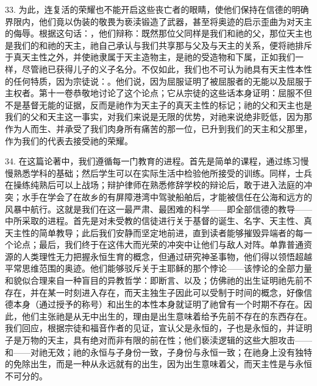 33. 为此，连复活的荣耀也不能开启这些丧亡者的眼睛，使他们保持在信德的明确界限内，他们竟以伪装的敬畏为亵渎锻造了武器，甚至将奥迹的启示歪曲为对天主的侮辱。根据这句话：，他们辩称：既然那位父同样是我们和祂的父，那位天主也是我们的和祂的天主，祂自己承认与我们共享那与父及与天主的关系，便将祂排斥于真天主性之外，并使祂隶属于天主造物主，是祂的受造物和下属，正如我们一样，尽管祂已获得儿子的义子名分。不仅如此，我们也不可认为祂具有天主性本性的任何特质，因为宗徒说：。他们说，因为屈服证明了被屈服者的无能以及屈服于主权者。第十一卷恭敬地讨论了这个论点；它从宗徒的这些话本身证明：屈服不但不是基督无能的证据，反而是祂作为天主子的真天主性的标记；祂的父和天主也是我们的父和天主这一事实，对我们来说是无限的优势，对祂来说绝非贬低，因为那作为人而生、并承受了我们肉身所有痛苦的那一位，已升到我们的天主和父那里，作为我们的代表去接受祂的荣耀。\par

34. 在这篇论著中，我们遵循每一门教育的进程。首先是简单的课程，通过练习慢慢熟悉学科的基础；然后学生可以在实际生活中检验他所接受的训练。同样，士兵在操练纯熟后可以上战场；辩护律师在熟悉修辞学校的辩论后，敢于进入法庭的冲突；水手在学会了在故乡的有屏障港湾中驾驶船舶后，才能被信任在公海和远方的风暴中航行。这就是我们在这一最严肃、最困难的科学——即全部信德的教导——中所采取的进程。首先是对未受教的信徒进行关于基督的诞生、名字、天主性、真天主性的简单教导；此后我们安静而坚定地前进，直到读者能够摧毁异端者的每一个论点；最后，我们终于在这伟大而光荣的冲突中让他们与敌人对阵。单靠普通资源的人类理性无力把握永恒生育的概念，但通过研究神圣事物，他们得以领悟超越平常思维范围的奥迹。他们能够驳斥关于主耶稣的那个悖论——该悖论的全部力量和貌似合理来自一种盲目的异教哲学：即断言、以及；仿佛祂的出生证明祂先前不存在，并在某一时刻进入存在，而天主独生子因此可以受制于时间的概念，好像信德本身（通过授予的称号）和出生的本性本身就证明了祂曾有一个时期不存在。因此，他们主张祂是从无中出生的，理由是出生意味着给予先前不存在的东西存在。我们回应，根据宗徒和福音作者的见证，宣认父是永恒的，子也是永恒的，并证明子是万物的天主，具有绝对而非有限的前在性；他们亵渎逻辑的这些大胆攻击——和——对祂无效；祂的永恒与子身份一致，子身份与永恒一致；在祂身上没有独特的免除出生，而是一种从永远就有的出生，因为出生意味着父，而天主性是与永恒不可分的。\par

